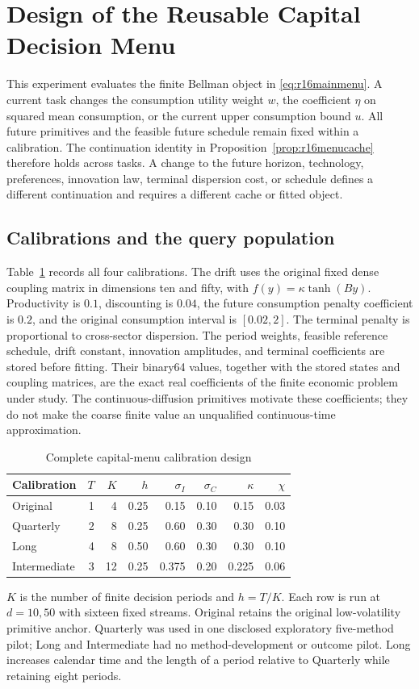 \section{Design of the Reusable Capital Decision Menu}
\label{app:r16menudesign}
This experiment evaluates the finite Bellman object in
\eqref{eq:r16mainmenu}. A current task changes the consumption utility weight
$w$, the coefficient $\eta$ on squared mean consumption, or the current upper
consumption bound $u$. All future primitives and the feasible future schedule
remain fixed within a calibration. The continuation identity in
Proposition~\ref{prop:r16menucache} therefore holds across tasks. A change to
the future horizon, technology, preferences, innovation law, terminal
dispersion cost, or schedule defines a different continuation and requires a
different cache or fitted object.

\subsection{Calibrations and the query population}
Table~\ref{tab:r16menucalibrations} records all four calibrations. The drift
uses the original fixed dense coupling matrix in dimensions ten and fifty,
with $f(y)=\kappa\tanh(By)$. Productivity is $0.1$, discounting is $0.04$,
the future consumption penalty coefficient is $0.2$, and the original
consumption interval is $[0.02,2]$. The terminal penalty is proportional to
cross-sector dispersion. The period weights, feasible reference schedule,
drift constant, innovation amplitudes, and terminal coefficients are stored
before fitting. Their binary64 values, together with the stored states and
coupling matrices, are the exact real coefficients of the finite economic
problem under study. The continuous-diffusion primitives motivate these
coefficients; they do not make the coarse finite value an unqualified
continuous-time approximation.

\begin{table}[!htbp]
\centering\small
\caption{Complete capital-menu calibration design}
\label{tab:r16menucalibrations}
\begin{tabular}{lrrrrrrr}
\toprule
Calibration & $T$ & $K$ & $h$ & $\sigma_I$ & $\sigma_C$ & $\kappa$ & $\chi$\\
\midrule
Original & 1 & 4 & 0.25 & 0.15 & 0.10 & 0.15 & 0.03\\
Quarterly & 2 & 8 & 0.25 & 0.60 & 0.30 & 0.30 & 0.10\\
Long & 4 & 8 & 0.50 & 0.60 & 0.30 & 0.30 & 0.10\\
Intermediate & 3 & 12 & 0.25 & 0.375 & 0.20 & 0.225 & 0.06\\
\bottomrule
\end{tabular}
\par\medskip\noindent\footnotesize\raggedright $K$ is the number of finite decision
periods and $h=T/K$. Each row is run at $d=10,50$ with sixteen fixed streams.
Original retains the original low-volatility primitive anchor. Quarterly
was used in one disclosed exploratory five-method pilot; Long and
Intermediate had no method-development or outcome pilot. Long increases
calendar time and the length of a period relative to Quarterly while
retaining eight periods.
\end{table}

